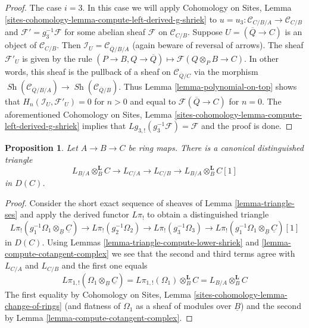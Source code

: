\documentclass{stacks-project}
\theoremstyle{plain}
\newtheorem{proposition}[subsection]{Proposition}
\theoremstyle{definition}
\theoremstyle{remark}
\numberwithin{equation}{subsection}
\def\Sh{\mathop{\mathit{Sh}}\nolimits}
\begin{document}
\begin{proof}
\medskip\noindent
The case $i = 3$. In this case we will apply
Cohomology on Sites, Lemma
\ref{sites-cohomology-lemma-compute-left-derived-g-shriek}
to $u = u_3 : \mathcal{C}_{C/B/A} \to \mathcal{C}_{C/B}$
and $\mathcal{F}' = g_3^{-1}\mathcal{F}$ for some abelian sheaf
$\mathcal{F}$ on $\mathcal{C}_{C/B}$.
Suppose $U = (\overline{Q} \to C)$ is an object of $\mathcal{C}_{C/B}$.
Then $\mathcal{I}_U = \mathcal{C}_{\overline{Q}/B/A}$ (again beware
of reversal of arrows). The sheaf $\mathcal{F}'_U$ is given by the
rule $(P \to B, Q \to \overline{Q}) \mapsto \mathcal{F}(Q \otimes_P B \to C)$.
In other words, this sheaf is the pullback of a sheaf
on $\mathcal{C}_{\overline{Q}/C}$ via the morphism
$\Sh(\mathcal{C}_{\overline{Q}/B/A}) \to \Sh(\mathcal{C}_{\overline{Q}/B})$.
Thus Lemma \ref{lemma-polynomial-on-top} shows that
$H_n(\mathcal{I}_U, \mathcal{F}'_U) = 0$ for $n > 0$
and equal to $\mathcal{F}(\overline{Q} \to C)$ for $n = 0$.
The aforementioned Cohomology on Sites, Lemma
\ref{sites-cohomology-lemma-compute-left-derived-g-shriek}
implies that $Lg_{3, !}(g_3^{-1}\mathcal{F}) = \mathcal{F}$ and
the proof is done.
\end{proof}

\begin{proposition}
\label{proposition-triangle}
Let $A \to B \to C$ be ring maps. There is a canonical distinguished
triangle
$$
L_{B/A} \otimes_B^\mathbf{L} C \to L_{C/A} \to L_{C/B} \to
L_{B/A} \otimes_B^\mathbf{L} C[1]
$$
in $D(C)$.
\end{proposition}

\begin{proof}
Consider the short exact sequence of sheaves of
Lemma \ref{lemma-triangle-ses}
and apply the derived functor $L\pi_!$ to obtain a distinguished
triangle
$$
L\pi_!(g_1^{-1}\Omega_1 \otimes_{\underline{B}} \underline{C}) \to
L\pi_!(g_2^{-1}\Omega_2) \to
L\pi_!(g_3^{-1}\Omega_3) \to
L\pi_!(g_1^{-1}\Omega_1 \otimes_{\underline{B}} \underline{C})[1]
$$
in $D(C)$. Using Lemmas \ref{lemma-triangle-compute-lower-shriek} and
\ref{lemma-compute-cotangent-complex}
we see that the second and third terms agree with $L_{C/A}$ and $L_{C/B}$
and the first one equals
$$
L\pi_{1, !}(\Omega_1 \otimes_{\underline{B}} \underline{C}) =
L\pi_{1, !}(\Omega_1) \otimes_B^\mathbf{L} C =
L_{B/A} \otimes_B^\mathbf{L} C
$$
The first equality by Cohomology on Sites, Lemma
\ref{sites-cohomology-lemma-change-of-rings}
(and flatness of $\Omega_1$ as a sheaf of modules over $\underline{B}$)
and the second by Lemma \ref{lemma-compute-cotangent-complex}.
\end{proof}
\end{document}
